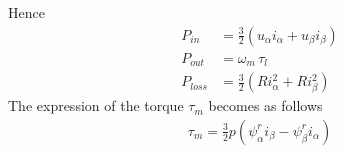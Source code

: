 \documentclass[11pt,a4paper,oneside]{book}
\numberwithin{equation}{section}
\theoremstyle{it}
\theoremstyle{definition}
\begin{document}
Hence
\begin{equation*}
	\begin{aligned}
		P_{in} &= \frac{3}{2}\left( u_\alpha i_\alpha+u_\beta 
		i_\beta\right)  \\[6pt]
		P_{out} &= \omega_m\,\tau_l \\[6pt]
		P_{loss} &= \frac{3}{2}\left( Ri_\alpha^2+Ri_\beta^2\right) 
	\end{aligned} 
\end{equation*}
The expression of the torque $\tau_m$ becomes as follows
\begin{equation}
	\begin{aligned}
		\tau_m = \frac{3}{2}p\left( 
		\psi^r_{\alpha}i_{\beta}-\psi^r_{\beta}i_{\alpha}\right) 
	\end{aligned} 
\end{equation}
\end{document}
